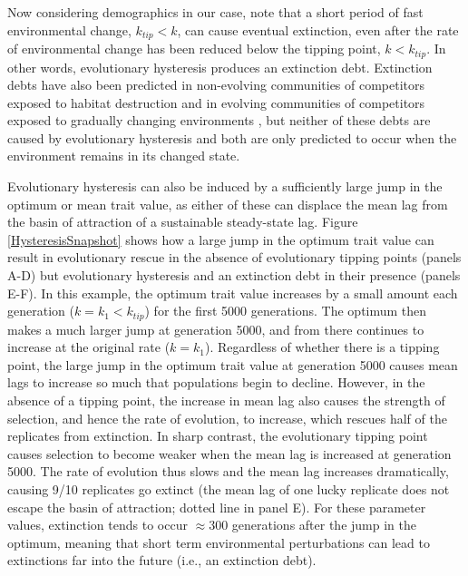 \documentclass[12pt,letterpaper]{article} %
\begin{document}
Now considering demographics in our case, note that a short period of fast environmental change, $k_{tip}<k$, can cause eventual extinction, even after the rate of environmental change has been reduced below the tipping point, $k<k_{tip}$.
In other words, evolutionary hysteresis produces an extinction debt.
Extinction debts have also been predicted in non-evolving communities of competitors exposed to habitat destruction \citep{Tilman1994a} and in evolving communities of competitors exposed to gradually changing environments \citep{Norberg2012}, but neither of these debts are caused by evolutionary hysteresis and both are only predicted to occur when the environment remains in its changed state.

Evolutionary hysteresis can also be induced by a sufficiently large jump in the optimum or mean trait value, as either of these can displace the mean lag from the basin of attraction of a sustainable steady-state lag.  
Figure \ref{HysteresisSnapshot} shows how a large jump in the optimum trait value can result in evolutionary rescue in the absence of evolutionary tipping points (panels A-D) but evolutionary hysteresis and an extinction debt in their presence (panels E-F).
In this example, the optimum trait value increases by a small amount each generation ($k=k_1<k_{tip}$) for the first 5000 generations.
The optimum then makes a much larger jump at generation 5000, and from there continues to increase at the original rate ($k=k_1$).   
Regardless of whether there is a tipping point, the large jump in the optimum trait value at generation 5000 causes mean lags to increase so much that populations begin to decline.
However, in the absence of a tipping point, the increase in mean lag also causes the strength of selection, and hence the rate of evolution, to increase, which rescues half of the replicates from extinction.
In sharp contrast, the evolutionary tipping point causes selection to become weaker when the mean lag is increased at generation 5000.
The rate of evolution thus slows and the mean lag increases dramatically, causing 9/10 replicates go extinct (the mean lag of one lucky replicate does not escape the basin of attraction; dotted line in panel E).
For these parameter values, extinction tends to occur $\approx300$ generations after the jump in the optimum, meaning that short term environmental perturbations can lead to extinctions far into the future (i.e., an extinction debt). 
 
\end{document}
